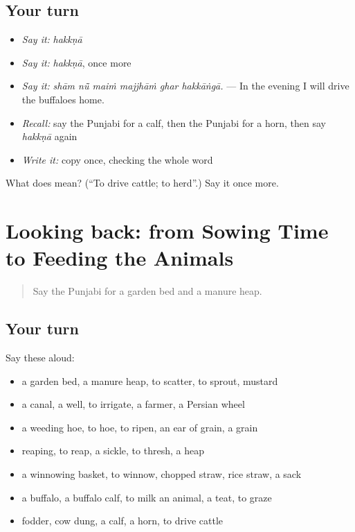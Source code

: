 \subsection*{Your turn}
\begin{itemize}
\raggedright
  \item \emph{Say it:} \emph{hakkṇā}
  \item \emph{Say it:} \emph{hakkṇā}, once more
  \item \emph{Say it:} \emph{shām nū̃ maiṁ majjhāṁ ghar hakkāṅgā.} — In the evening I will drive the buffaloes home.
  \item \emph{Recall:} say the Punjabi for a calf, then the Punjabi for a horn, then say \emph{hakkṇā} again
  \item \emph{Write it:} copy \textbf{} once, checking the whole word
\end{itemize}

\begin{tcolorbox}[breakable,colback=teal!4,colframe=teal!35!black,title={Before you move on}]
What does  mean? (\textquotedblleft{}To drive cattle; to herd\textquotedblright{}.) Say it once more.
\end{tcolorbox}
\section[(dialogue)]{Looking back: from Sowing Time to Feeding the Animals}

\label{lesson:PA-R308-review-302-308}



\begin{quote}
Say the Punjabi for a garden bed and a manure heap.
\end{quote}

\subsection*{Your turn}
Say these aloud:

\begin{itemize}
\raggedright
  \item a garden bed, a manure heap, to scatter, to sprout, mustard
  \item a canal, a well, to irrigate, a farmer, a Persian wheel
  \item a weeding hoe, to hoe, to ripen, an ear of grain, a grain
  \item reaping, to reap, a sickle, to thresh, a heap
  \item a winnowing basket, to winnow, chopped straw, rice straw, a sack
  \item a buffalo, a buffalo calf, to milk an animal, a teat, to graze
  \item fodder, cow dung, a calf, a horn, to drive cattle
\end{itemize}

